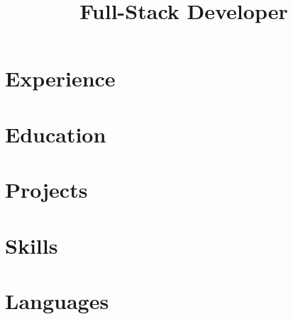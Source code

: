 \documentclass[11pt,a4paper,sans]{moderncv}
\title{Full-Stack Developer}
\begin{document}
\makecvtitle

\section{Experience}
\section{Education}
\section{Projects}
\section{Skills}
\section{Languages}
\end{document}
